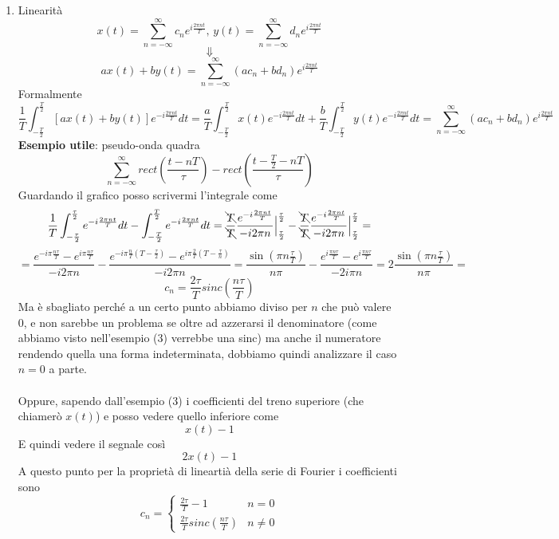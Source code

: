 \documentclass{article}
\newcommand{\accapo}{\\\hspace*{1cm}\\}
\begin{document}
\begin{enumerate}
    \item \large Linearità\normalsize
        \[x(t)=\sum_{n=-\infty}^{\infty}c_n e^{i\frac{2\pi nt}{T}},\, y(t)=\sum_{n=-\infty}^{\infty}d_n e^{i\frac{2\pi nt}{T}}\]
        \[\Downarrow\]
        \[ax(t)+by(t)=\sum_{n=-\infty}^{\infty}(ac_n+bd_n) e^{i\frac{2\pi nt}{T}}\]
        Formalmente
        \[\frac{1}{T}\int_{-\frac{T}{2}}^\frac{T}{2}[ax(t)+by(t)]e^{-i\frac{2\pi nt}{T}}dt=\frac{a}{T}\int_{-\frac{T}{2}}^\frac{T}{2}x(t)e^{-i\frac{2\pi nt}{T}}dt+\frac{b}{T}\int_{-\frac{T}{2}}^\frac{T}{2}y(t)e^{-i\frac{2\pi nt}{T}}dt=\sum_{n=-\infty}^{\infty}(ac_n+bd_n) e^{i\frac{2\pi nt}{T}}\]
        \textbf{Esempio utile}: pseudo-onda quadra
        \[\sum_{n=-\infty}^\infty rect\left(\frac{t-nT}{\tau}\right)-rect\left(\frac{t-\frac{T}{2}-nT}{\tau}\right)\]
        Guardando il grafico posso scrivermi l'integrale come
        \[\frac{1}{T}\int_{-\frac{\tau}{2}}^\frac{\tau}{2}e^{-i\frac{2\pi nt}{T}}dt-\int_{-\frac{T}{2}}^\frac{T}{2}e^{-i\frac{2\pi nt}{T}}dt=\frac{\bcancel{T}}{\bcancel{T}}\frac{e^{-i\frac{2\pi nt}{T}}}{-i2\pi n}\Big|_{\frac{\tau}{2}}^\frac{\tau}{2}-\frac{\bcancel{T}}{\bcancel{T}}\frac{e^{-i\frac{2\pi nt}{T}}}{-i2\pi n}\Big|_{\frac{\tau}{2}}^\frac{\tau}{2}=\]
        \[=\frac{e^{-i\pi\frac{n\tau}{T}}-e^{i\pi\frac{n\tau}{T}}}{-i2\pi n}-\frac{e^{-i\pi\frac{n}{T}\left(T-\frac{\tau}{2}\right)}-e^{i\pi\frac{2}{T}\left(T-\frac{\tau}{n}\right)}}{-i2\pi n}=\frac{\sin\left(\pi n\frac{\tau}{T}\right)}{n\pi}-\frac{e^{i\frac{\pi n\tau}{T}}-e^{i\frac{\pi n\tau}{T}}}{-2i\pi n}=2\frac{\sin\left(\pi n\frac{\tau}{T}\right)}{n\pi}=\]
        \[c_n=\frac{2\tau}{T}sinc\left(\frac{n\tau}{T}\right)\]
        Ma è sbagliato perché a un certo punto abbiamo diviso per \(n\) che può valere 0, e non sarebbe un problema se oltre ad azzerarsi il denominatore (come abbiamo visto nell'esempio (3) verrebbe una sinc) ma anche il numeratore rendendo quella una forma indeterminata, dobbiamo quindi analizzare il caso \(n=0\) a parte.\accapo
        Oppure, sapendo dall'esempio (3) i coefficienti del treno superiore (che chiamerò \(x(t)\)) e posso vedere quello inferiore come
        \[x(t)-1\]
        E quindi vedere il segnale così
        \[2x(t)-1\]
        A questo punto per la proprietà di lineartià della serie di Fourier i coefficienti sono
        \[c_n=\begin{cases}
            \frac{2\tau}{T}-1&n=0\\
            \frac{2\tau}{T}sinc\left(\frac{n\tau}{T}\right)&n\neq0
        \end{cases}\]

\end{enumerate}
\end{document}
